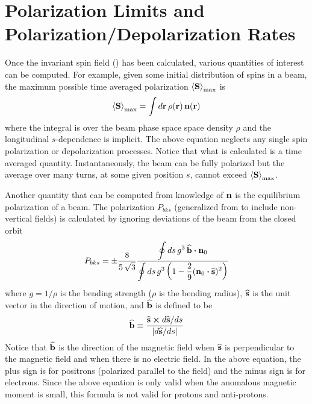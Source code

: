\section{Polarization Limits and Polarization/Depolarization Rates}
\label{s:spin.pol}

Once the invariant spin field () has been calculated, various quantities of interest can be
computed. For example, given some initial distribution of spins in a beam, the maximum possible time
averaged polarization $\left< {\bf S} \right>_{\max}$ is
\begin{equation}
  \left< {\bf S} \right>_{\max} = \int d{\bf r} \, \rho({\bf r}) \, {\bf n}({\bf r})
\end{equation}
where the integral is over the beam phase space space density $\rho$ and the longitudinal
$s$-dependence is implicit. The above equation neglects any single spin polarization or
depolarization processes. Notice that what is calculated is a time averaged quantity.
Instantaneously, the beam can be fully polarized but the average over many turns, at some given
position $s$, cannot exceed $\left< {\bf S} \right>_{\max}$.

Another quantity that can be computed from knowledge of ${\bf n}$ is the equilibrium polarization of a
beam. The  polarization $P_{bks}$ (generalized from
 to include non-vertical fields) is calculated by ignoring deviations of the beam
from the closed orbit\cite{b:barber99}
\begin{equation}
  P_{bks} = \pm \frac{8}{5 \, \sqrt{3}}
  \frac{\displaystyle \oint ds \, g^3 \, \widehat{{\bf b}} \mathbin{\boldsymbol{\cdot}} {\bf n}_0}
  {\displaystyle \oint ds \, g^3 \left( 1 - \frac{2}{9} ({\bf n}_0 \mathbin{\boldsymbol{\cdot}} \widehat{{\bf s}})^2 \right)}
  \label{pbks}
\end{equation}
where $g = 1/\rho$ is the bending strength ($\rho$ is the bending radius), $\widehat{{\bf s}}$ is the unit
vector in the direction of motion, and $\widehat{{\bf b}}$ is defined to be
\begin{equation}
  \widehat{{\bf b}} \equiv \frac{\widehat{{\bf s}} \mathbin{\boldsymbol{\times}} d\widehat{{\bf s}}/ds}{|d\widehat{{\bf s}}/ds|}
\end{equation}
Notice that $\widehat{{\bf b}}$ is the direction of the magnetic field when $\widehat{{\bf s}}$ is perpendicular to
the magnetic field and when there is no electric field. In the above equation, the plus sign is for
positrons (polarized parallel to the field) and the minus sign is for electrons. Since the above
equation is only valid when the anomalous magnetic moment is small\cite{b:jackson}, this formula is
not valid for protons and anti-protons.

